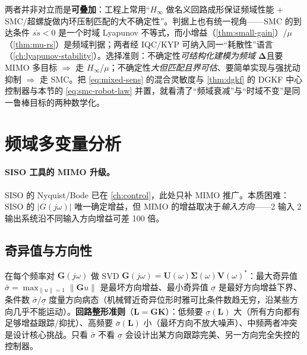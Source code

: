 \begin{insight}
两者并非对立而是\textbf{可叠加}：工程上常用“$H_\infty$ 做名义回路成形保证频域性能 + SMC/超螺旋做内环压制匹配的大不确定性”。判据上也有统一视角——SMC 的到达条件 $s\dot s<0$ 是一个时域 Lyapunov 不等式，而小增益（\cref{thm:small-gain}）/$\mu$（\cref{thm:mu-rs}）是频域判据；两者经 IQC/KYP 可纳入同一“耗散性”语言（\cref{ch:lyapunov-stability}）。选择准则：不确定性\emph{可结构化建模为频域 $\boldsymbol\Delta$}且要 MIMO 多目标 $\Rightarrow$ 走 $H_\infty$/$\mu$；不确定性\emph{大但匹配且界可估}、要简单实现与强扰动抑制 $\Rightarrow$ 走 SMC。把 \cref{eq:mixed-sens} 的混合灵敏度与 \cref{thm:dgkf} 的 DGKF 中心控制器与本节的 \cref{eq:smc-robot-law} 并置，就看清了“频域衰减”与“时域不变”是同一鲁棒目标的两种数学化。
\end{insight}

\section{频域多变量分析}
\label{sec:mimo-freq}

\paragraph{SISO 工具的 MIMO 升级。}
SISO 的 Nyquist/Bode 已在 \cref{ch:control}，此处只补 MIMO 推广。本质困难：SISO 的 $|G(j\omega)|$ 唯一确定增益，但 MIMO 的增益取决于\emph{输入方向}——2 输入 2 输出系统沿不同输入方向增益可差 100 倍。

\subsection{奇异值与方向性}
在每个频率对 $\mathbf G(j\omega)$ 做 SVD $\mathbf G(j\omega)=\mathbf U(\omega)\boldsymbol\Sigma(\omega)\mathbf V(\omega)^*$：最大奇异值 $\bar\sigma=\max_{\|u\|=1}\|\mathbf Gu\|$ 是最坏方向增益、最小奇异值 $\underline\sigma$ 是最好方向增益下界、条件数 $\bar\sigma/\underline\sigma$ 度量方向病态（机械臂近奇异位形时雅可比条件数趋无穷，沿某些方向几乎不能运动）。\textbf{回路整形准则}（$\mathbf L=\mathbf G\mathbf K$）：低频要 $\underline\sigma(\mathbf L)$ 大（所有方向都有足够增益跟踪/抑扰）、高频要 $\bar\sigma(\mathbf L)$ 小（最坏方向不放大噪声）、中频两者冲突是设计核心挑战。只看 $\bar\sigma$ 不看 $\underline\sigma$ 会设计出某方向跟踪完美、另一方向完全失控的控制器。

